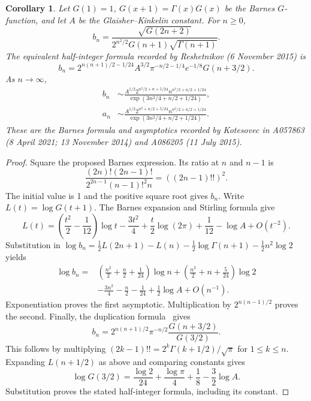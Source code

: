 \documentclass[11pt]{article}
\newtheorem{corollary}[theorem]{Corollary}
\begin{document}
\begin{corollary}\label{cor:barnes}
Let $G(1)=1$, $G(x+1)=\Gamma(x)G(x)$ be the Barnes $G$-function,
and let $A$ be the Glaisher--Kinkelin constant. For $n\ge0$,
\[
b_n=\frac{\sqrt{G(2n+2)}}{2^{n^2/2}G(n+1)\sqrt{\Gamma(n+1)}}.
\]
The equivalent half-integer formula recorded by Reshetnikov (6 November 2015) is
\[
 b_n=2^{n(n+1)/2-1/24}A^{3/2}\pi^{-n/2-1/4}e^{-1/8}G(n+3/2).
\]
As $n\to\infty$,
\begin{align*}
 b_n&\sim\frac{A^{1/2}2^{n^2/2+n+5/24}
 n^{n^2/2+n/2+1/24}}{\exp(3n^2/4+n/2+1/24)},\\
 a_n&\sim\frac{A^{1/2}2^{n^2+n/2+5/24}
 n^{n^2/2+n/2+1/24}}{\exp(3n^2/4+n/2+1/24)}.
\end{align*}
These are the Barnes formula and asymptotics recorded by Kotesovec in
A057863 (8 April 2021; 13 November 2014) and A086205 (11 July 2015).
\end{corollary}
\begin{proof}
Square the proposed Barnes expression. Its ratio at $n$ and $n-1$ is
\[
 \frac{(2n)!(2n-1)!}{2^{2n-1}(n-1)!^2 n}=((2n-1)!!)^2.
\]
The initial value is 1 and the positive square root gives $b_n$.
Write $L(t)=\log G(t+1)$. The Barnes expansion and Stirling formula
give~\cite[5.17.5--5.17.7; 5.11.1]{dlmf}
\[
 L(t)=\left(\frac{t^2}{2}-\frac1{12}\right)\log t
 -\frac{3t^2}{4}+\frac t2\log(2\pi)+\frac1{12}-\log A+O(t^{-2}).
\]
Substitution in
$\log b_n=\tfrac12L(2n+1)-L(n)-\tfrac12\log\Gamma(n+1)
-\tfrac12n^2\log2$ yields
\begin{align*}
 \log b_n={}&\left(\frac{n^2}{2}+\frac n2+\frac1{24}\right)\log n
 +\left(\frac{n^2}{2}+n+\frac5{24}\right)\log2\\
 &-\frac{3n^2}{4}-\frac n2-\frac1{24}+\frac12\log A+O(n^{-1}).
\end{align*}
Exponentiation proves the first asymptotic. Multiplication by
$2^{n(n-1)/2}$ proves the second.
Finally, the duplication formula~\cite[5.5.5]{dlmf} gives
\[
 b_n=2^{n(n+1)/2}\pi^{-n/2}\frac{G(n+3/2)}{G(3/2)}.
\]
This follows by multiplying
$(2k-1)!!=2^k\Gamma(k+1/2)/\sqrt\pi$ for $1\le k\le n$.
Expanding $L(n+1/2)$ as above and comparing constants gives
\[
 \log G(3/2)=\frac{\log2}{24}+\frac{\log\pi}{4}
 +\frac18-\frac32\log A.
\]
Substitution proves the stated half-integer formula, including its constant.
\end{proof}
\end{document}
